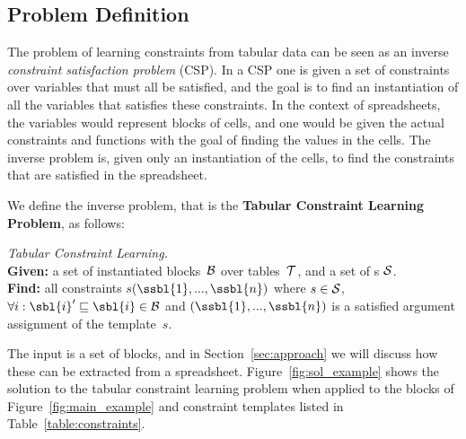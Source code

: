 \subsection{Problem Definition}\label{sec:problem_statement}
The problem of learning constraints from tabular data can be seen as an inverse {\em constraint satisfaction problem} (CSP).
In a CSP one is given a set of constraints over variables that must all be satisfied, and the goal is to find an instantiation of all the variables that satisfies these constraints.
In the context of spreadsheets, the variables would represent blocks of cells, and one would be given the actual constraints and functions with the goal of finding the values in the cells.
The inverse problem is, given only an instantiation of the cells, to find the constraints that are satisfied in the spreadsheet.

We define the inverse problem, that is the {\bf Tabular Constraint Learning Problem}, as follows:
%
\begin{definition} \textit{Tabular Constraint Learning.}\label{def:problem_statement}\\
{\bf Given:} a set of instantiated blocks~${\cal B}$ over tables~${\cal T}$, and a set of {\template}s ${\cal S}$.\\
{\bf Find:} all constraints $s(\ssbl{1}, ..., \ssbl{n})$ where $s \in {\cal S}$, $\forall i: \sbl{i}' \sqsubseteq \sbl{i} \in {\cal B}$ and $(\ssbl{1}, ..., \ssbl{n})$ is a satisfied argument assignment of the template~$s$.
\end{definition}


The input is a set of blocks, and in Section~\ref{sec:approach} we will discuss how these can be extracted from a spreadsheet.
Figure~\ref{fig:sol_example} shows the solution to the tabular constraint learning problem when applied to the blocks of Figure~\ref{fig:main_example} and constraint templates listed in Table~\ref{table:constraints}.

